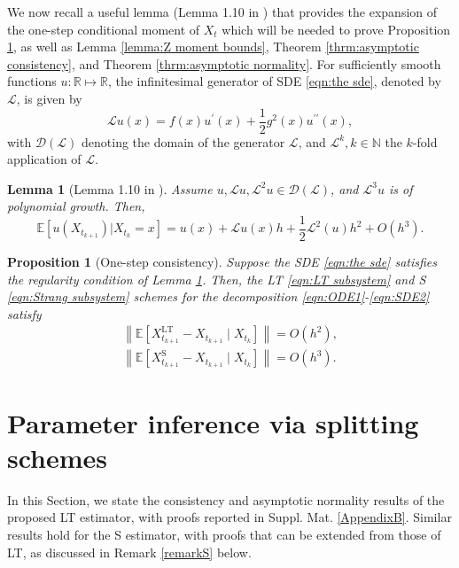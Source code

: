 \documentclass[a4paper,12pt]{article}
\numberwithin{equation}{section}
\theoremstyle{plain}
\newtheorem{lemma}[theorem]{Lemma}
\newtheorem{proposition}[theorem]{Proposition}
\theoremstyle{definition}
\begin{document}
We now recall a useful lemma 
 (Lemma 1.10 in \cite{kessler_statistical_2012}) that provides the expansion of the one-step conditional moment of $X_t$ which will be needed to prove Proposition \ref{prop:pearson consistency}, as well as Lemma \ref{lemma:Z moment bounds}, Theorem \ref{thrm:asymptotic consistency}, and Theorem \ref{thrm:asymptotic normality}. For sufficiently smooth functions $u:\mathbb{R}\mapsto \mathbb{R}$, the infinitesimal generator of SDE \eqref{eqn:the sde}, denoted by $\mathcal{L}$, is given by
\begin{equation*}
    \mathcal{L}u(x)=f(x)u^{\prime}(x)+\frac{1}{2}g^2(x)u^{\prime \prime}(x),
\end{equation*}
with $\mathcal{D}(\mathcal{L})$ denoting the domain of the generator $\mathcal{L}$, and $\mathcal{L}^k,k\in \mathbb{N}$ the $k$-fold application of $\mathcal{L}$.
\begin{lemma}[Lemma 1.10 in \cite{kessler_statistical_2012}]\label{lemma:expectation expansion}
    Assume $u, \mathcal{L} u, \mathcal{L}^2 u \in \mathcal{D}(\mathcal{L})$, and $\mathcal{L}^3u$ is of polynomial growth. Then,
\begin{equation}\label{eqn:Conditional expansion}
        \mathbb{E}[u(X_{t_{k+1}})|X_{t_k}=x]=u(x)+\mathcal{L}u(x)h+\frac{1}{2}\mathcal{L}^2(u)h^2+O(h^{3}).
    \end{equation}
\end{lemma}
\begin{proposition}[One-step consistency]
\label{prop:pearson consistency}
    Suppose the SDE \eqref{eqn:the sde} satisfies the regularity condition of Lemma \ref{lemma:expectation expansion}.
    Then, the LT \eqref{eqn:LT subsystem} and S \eqref{eqn:Strang subsystem} schemes for the decomposition \eqref{eqn:ODE1}-\eqref{eqn:SDE2}
    satisfy
    \begin{align}
       \left\| \mathbb{E}\left[X^{\textrm{LT}}_{t_{k+1}}-X_{t_{k+1}}\mid X_{t_k}\right]\right\|=O(h^2), \label{eqn:ergodic LT consistency} \\ 
       \left\| \mathbb{E}\left[X^{\textrm{S}}_{t_{k+1}}-X_{t_{k+1}}\mid X_{t_k}\right]\right\|=O(h^3). \label{eqn:ergodic Strang consistency}
    \end{align}
\end{proposition}  

\section{Parameter inference via splitting schemes}\label{sec:likelihood}
In this Section, we state the  consistency and asymptotic normality results of the proposed LT estimator, with proofs reported in Suppl. Mat. \ref{AppendixB}. Similar results hold for the S estimator, with proofs that can be extended from those of LT, as discussed in Remark \ref{remarkS} below.
\end{document}
